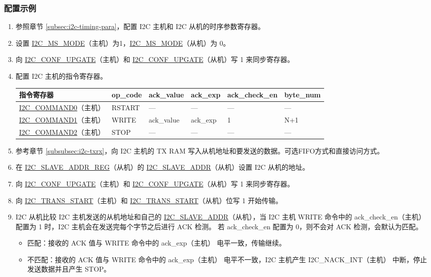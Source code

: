 \documentclass[main\_\_CN.tex]{subfiles}
\begin{document}
\subsubsection{配置示例}
\begin{enumerate}
\item 参照章节 \ref{subsec:i2c-timing-para}，配置 I2C 主机和 I2C 从机的时序参数寄存器。
\item 设置 \hyperref[fielddesc:I2CMSMODE]{I2C\_MS\_MODE}（主机）为1，\hyperref[fielddesc:I2CMSMODE]{I2C\_MS\_MODE}（从机）为 0。
\item 向 \hyperref[fielddesc:I2CCONFUPGATE]{I2C\_CONF\_UPGATE}（主机）和 \hyperref[fielddesc:I2CCONFUPGATE]{I2C\_CONF\_UPGATE}（从机）写 1 来同步寄存器。

\item 配置 I2C 主机的指令寄存器。

\begin{longtable}{ | p{4cm} | p{2cm} | p{2cm} | p{2cm} |p{2cm} | p{2cm} |}
\hline\rowcolor{lightgray}
指令寄存器& op\_code & ack\_value&ack\_exp&ack\_check\_en&byte\_num  \\ \hline
\hyperref[fielddesc:I2CCOMMAND0]{I2C\_COMMAND0}（主机）& RSTART& ---&---&---&---  \\ \hline
\hyperref[fielddesc:I2CCOMMAND1]{I2C\_COMMAND1}（主机）& WRITE& ack\_value&ack\_exp&1&N+1  \\ \hline
\hyperref[fielddesc:I2CCOMMAND2]{I2C\_COMMAND2}（主机）& STOP& ---&---&---&---  \\ \hline
\end{longtable}

\item 参考章节 \ref{subsubsec:i2c-txrx}，向 I2C 主机的 TX RAM 写入从机地址和要发送的数据。可选FIFO方式和直接访问方式。
\item 在 \hyperref[regdesc:I2CSLAVEADDRREG]{I2C\_SLAVE\_ADDR\_REG}（从机）的 \hyperref[fielddesc:I2CSLAVEADDR]{I2C\_SLAVE\_ADDR}（从机）设置 I2C 从机的地址。
\item 向 \hyperref[fielddesc:I2CCONFUPGATE]{I2C\_CONF\_UPGATE}（主机）和 \hyperref[fielddesc:I2CCONFUPGATE]{I2C\_CONF\_UPGATE}（从机）写 1 来同步寄存器。
\item 向 \hyperref[fielddesc:I2CTRANSSTART]{I2C\_TRANS\_START}（主机）和 \hyperref[fielddesc:I2CTRANSSTART]{I2C\_TRANS\_START}（从机）位写 1 开始传输。
\item I2C 从机比较 I2C 主机发送的从机地址和自己的 \hyperref[fielddesc:I2CSLAVEADDR]{I2C\_SLAVE\_ADDR}（从机），当 I2C 主机 WRITE 命令中的 ack\_check\_en（主机）配置为 1 时，I2C 主机会在发送完每个字节之后进行 ACK 检测。 若 ack\_check\_en 配置为 0，则不会对 ACK 检测，会默认为匹配。
\begin{itemize}
\item 匹配：接收的 ACK 值与 WRITE 命令中的 ack\_exp（主机） 电平一致，传输继续。
\item 不匹配：接收的 ACK 值与 WRITE 命令中的 ack\_exp（主机） 电平不一致，I2C 主机产生 I2C\_NACK\_INT（主机） 中断，停止发送数据并且产生 STOP。
\end{itemize}


\end{enumerate}
\end{document}

